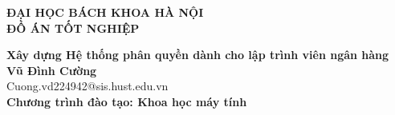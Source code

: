 \documentclass[DoAn.tex]{subfiles}
\begin{document}
\begin{titlepage}
\thispagestyle{empty}
\begin{center}

{\textbf{\large{ĐẠI HỌC BÁCH KHOA HÀ NỘI}}}\\[4cm]

{\textbf{\huge{ ĐỒ ÁN TỐT NGHIỆP}}}\\[1cm]
{\textbf{\Large{Xây dựng Hệ thống phân quyền dành cho lập trình viên ngân hàng}}\\[1cm]

{\textbf{\large{Vũ Đình Cường}}}\\
{\large{Cuong.vd224942@sis.hust.edu.vn}}\\[0.5cm]

{\textbf{\large{Chương trình đào tạo: Khoa học máy tính}}}\\

\vspace{3.5cm}
\begin{table}[H]
\centering
{}
\end{table}}
\end{center}



\end{titlepage}
\end{document}
